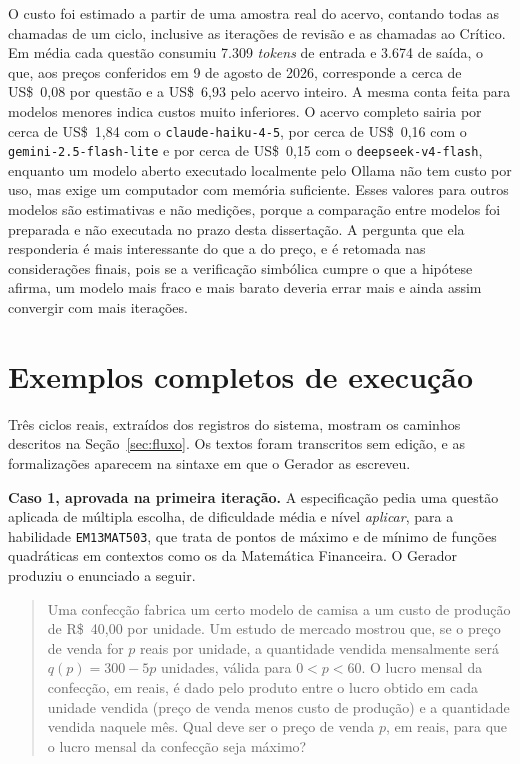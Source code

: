 O custo foi estimado a partir de uma amostra real do acervo, contando todas as chamadas de um
ciclo, inclusive as iterações de revisão e as chamadas ao Crítico. Em média cada questão consumiu
7.309 \emph{tokens} de entrada e 3.674 de saída, o que, aos preços conferidos em 9 de agosto de
2026, corresponde a cerca de US\$~0,08 por questão e a US\$~6,93 pelo acervo inteiro. A mesma conta
feita para modelos menores indica custos muito inferiores. O acervo completo sairia por cerca de
US\$~1,84 com o \texttt{claude-haiku-4-5}, por cerca de US\$~0,16 com o
\texttt{gemini-2.5-flash-lite} e por cerca de US\$~0,15 com o \texttt{deepseek-v4-flash}, enquanto
um modelo aberto executado localmente pelo Ollama não tem custo por uso, mas exige um computador com
memória suficiente. Esses valores para outros modelos são estimativas e não medições, porque a
comparação entre modelos foi preparada e não executada no prazo desta dissertação. A pergunta que
ela responderia é mais interessante do que a do preço, e é retomada nas considerações finais, pois
se a verificação simbólica cumpre o que a hipótese afirma, um modelo mais fraco e mais barato deveria
errar mais e ainda assim convergir com mais iterações.

\section{Exemplos completos de execução}
\label{sec:exemplos}

Três ciclos reais, extraídos dos registros do sistema, mostram os caminhos descritos na
Seção~\ref{sec:fluxo}. Os textos foram transcritos sem edição, e as formalizações aparecem na
sintaxe em que o Gerador as escreveu.

\textbf{Caso 1, aprovada na primeira iteração.} A especificação pedia uma questão aplicada de
múltipla escolha, de dificuldade média e nível \emph{aplicar}, para a habilidade
\texttt{EM13MAT503}, que trata de pontos de máximo e de mínimo de funções quadráticas em
contextos como os da Matemática Financeira. O Gerador produziu o enunciado a seguir.

\begin{quote}\small
Uma confecção fabrica um certo modelo de camisa a um custo de produção de R\$~40,00 por unidade.
Um estudo de mercado mostrou que, se o preço de venda for $p$ reais por unidade, a quantidade
vendida mensalmente será $q(p) = 300 - 5p$ unidades, válida para $0 < p < 60$. O lucro mensal da
confecção, em reais, é dado pelo produto entre o lucro obtido em cada unidade vendida (preço de
venda menos custo de produção) e a quantidade vendida naquele mês. Qual deve ser o preço de venda
$p$, em reais, para que o lucro mensal da confecção seja máximo?
\end{quote}

